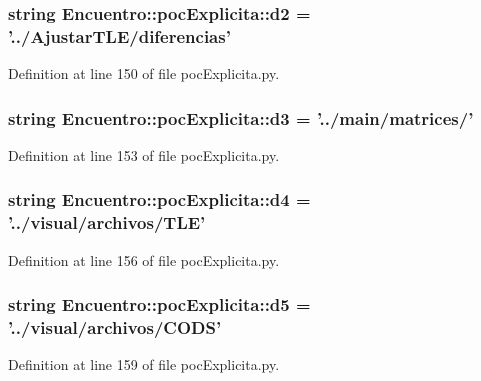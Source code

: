 \subsubsection[{d2}]{\setlength{\rightskip}{0pt plus 5cm}string {\bf \-Encuentro\-::poc\-Explicita\-::d2} = '../\-Ajustar\-T\-L\-E/diferencias'}\label{namespace_encuentro_1_1poc_explicita_a7729370dffef751488eeb7ab37fb3f81}


\-Definition at line 150 of file poc\-Explicita.\-py.

\subsubsection[{d3}]{\setlength{\rightskip}{0pt plus 5cm}string {\bf \-Encuentro\-::poc\-Explicita\-::d3} = '../main/matrices/'}\label{namespace_encuentro_1_1poc_explicita_ab944c29b94ff53ca78ef743b475265bb}


\-Definition at line 153 of file poc\-Explicita.\-py.

\subsubsection[{d4}]{\setlength{\rightskip}{0pt plus 5cm}string {\bf \-Encuentro\-::poc\-Explicita\-::d4} = '../visual/archivos/\-T\-L\-E'}\label{namespace_encuentro_1_1poc_explicita_a5f1affeb758492584226917f70c3ed2d}


\-Definition at line 156 of file poc\-Explicita.\-py.

\subsubsection[{d5}]{\setlength{\rightskip}{0pt plus 5cm}string {\bf \-Encuentro\-::poc\-Explicita\-::d5} = '../visual/archivos/\-C\-O\-D\-S'}\label{namespace_encuentro_1_1poc_explicita_a1af5c083590ce8fe3a0ec7a823fbb886}


\-Definition at line 159 of file poc\-Explicita.\-py.


